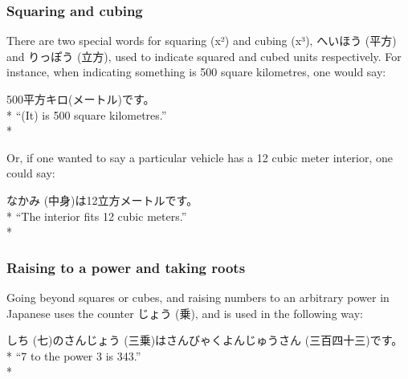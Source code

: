 \documentclass[11pt, b5paper, twoside, openright, onecolumn]{book}
\makeatletter
\newcommand*{\rubystack}[2]{{\relscale{0.5}%
  \begin{tabular}[b]{@{}c@{}}%
    {#1}\\%
   {\textscale{2}{#2}}%
  \end{tabular}}%
}
\DeclareRobustCommand*{\ruby}[2]{%
  \mbox{%
    \setlength{\parskip}{0ex}%
    \BeginAccSupp{method=pdfstringdef,ActualText={#1}}%
      \rubystack{\phantom{#2}}{#1}%
      \llap{%
        \rubystack{#2}{\phantom{#1}}%
      }%
    \EndAccSupp{}%
  }%
}
\renewcommand*{\ruby}[2]{#2 (#1)}%
\newenvironment{exampleblock}{
\setlength{\parindent}{0.6in}
\begin{minipage}[t]{\dimexpr\textwidth-\parindent}}
{\end{minipage}}
\makeatother
\begin{document}
\subsubsection{Squaring and cubing}

There are two special words for squaring (x²) and cubing (x³)‚ \ruby{平方}{へいほう} and \ruby{立方}{りっぽう}‚ used to indicate squared and cubed units respectively. For instance‚ when indicating something is 500 square kilometres‚ one would say:

\vspace{0.4cm}
\begin{exampleblock}
500平方キロ(メートル)です。 \\* 
“(It) is 500 square kilometres.” \\* 
\end{exampleblock}
\vspace{0.2cm}

Or‚ if one wanted to say a particular vehicle has a 12 cubic meter interior‚ one could say:

\vspace{0.4cm}
\begin{exampleblock}
\ruby{中身}{なかみ}は12立方メートルです。 \\* 
“The interior fits 12 cubic meters.” \\* 
\end{exampleblock}
\subsubsection{Raising to a power and taking roots}


Going beyond squares or cubes‚ and raising numbers to an arbitrary power in Japanese uses the counter \ruby{乗}{じょう}‚ and is used in the following way:

\vspace{0.4cm}
\begin{exampleblock}
\ruby{七}{しち}の\ruby{三乗}{さんじょう}は\ruby{三百四十三}{さんびゃくよんじゅうさん}です。 \\* 
“7 to the power 3 is 343.” \\* 
\end{exampleblock}
\vspace{0.2cm}
\end{document}
